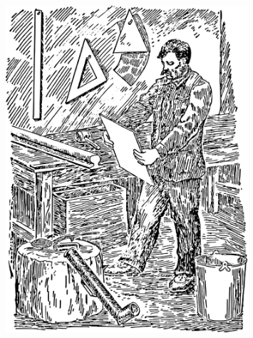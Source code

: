 \begin{figure}[h!]
\centering
\includegraphics[width=0.8\textwidth]{figures/ch-12/fig-183.pdf}
\end{figure}



